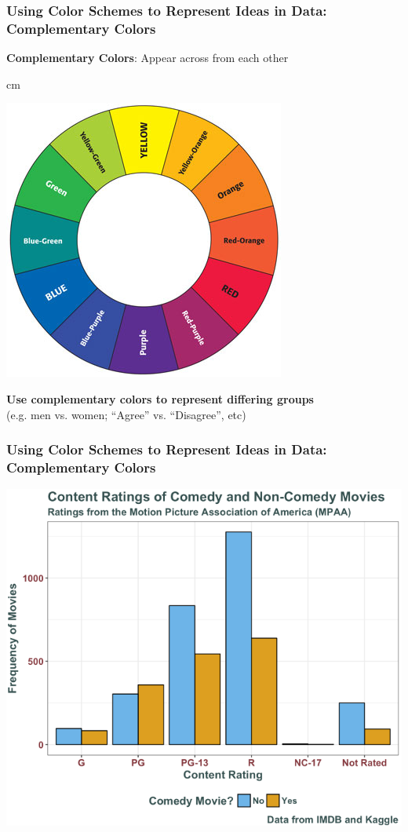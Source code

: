 \documentclass{beamer} %
\begin{document}
\begin{frame}\frametitle{Using Color Schemes to Represent Ideas in Data:  Complementary Colors}
	\centering
	
	\textbf{Complementary Colors}:  Appear across from each other
	
	 cm
	
	\includegraphics[width=0.55\linewidth]{colorwheel2}
	
	\textbf{Use complementary colors to represent differing groups} \\(e.g. men vs. women; ``Agree'' vs. ``Disagree'', etc)
	
\end{frame}



\begin{frame}\frametitle{Using Color Schemes to Represent Ideas in Data:  Complementary Colors}
	\centering
	
	\includegraphics[width=0.81\linewidth]{labexam.png}
	
\end{frame}
\end{document}
